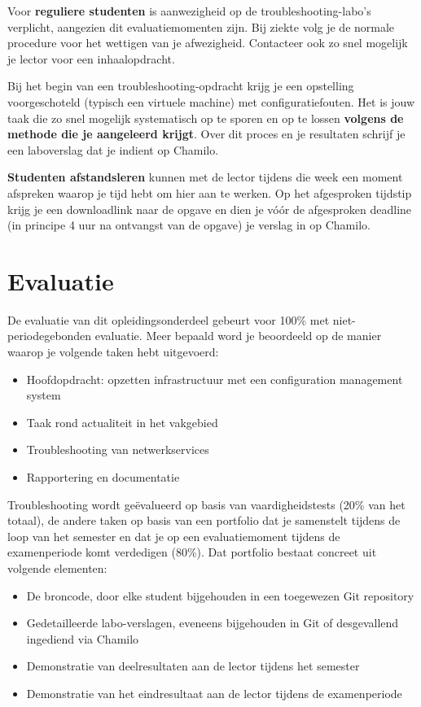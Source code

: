 Voor \textbf{reguliere studenten} is aanwezigheid op de troubleshooting-labo's verplicht, aangezien dit evaluatiemomenten zijn. Bij ziekte volg je de normale procedure voor het wettigen van je afwezigheid. Contacteer ook zo snel mogelijk je lector voor een inhaalopdracht.

Bij het begin van een troubleshooting-opdracht krijg je een opstelling voorgeschoteld (typisch een virtuele machine) met configuratiefouten. Het is jouw taak die zo snel mogelijk systematisch op te sporen en op te lossen \textbf{volgens de methode die je aangeleerd krijgt}. Over dit proces en je resultaten schrijf je een laboverslag dat je indient op Chamilo.

\textbf{Studenten afstandsleren} kunnen met de lector tijdens die week een moment afspreken waarop je tijd hebt om hier aan te werken. Op het afgesproken tijdstip krijg je een downloadlink naar de opgave en dien je vóór de afgesproken deadline (in principe 4 uur na ontvangst van de opgave) je verslag in op Chamilo.

\section{Evaluatie}
\label{sec:evaluatie}

De evaluatie van dit opleidingsonderdeel gebeurt voor 100\% met niet-periodegebonden evaluatie. Meer bepaald word je beoordeeld op de manier waarop je volgende taken hebt uitgevoerd:

\begin{itemize}
  \item Hoofdopdracht: opzetten infrastructuur met een configuration management system
  \item Taak rond actualiteit in het vakgebied
  \item Troubleshooting van netwerkservices
  \item Rapportering en documentatie
\end{itemize}

Troubleshooting wordt geëvalueerd op basis van vaardigheidstests (20\% van het totaal), de andere taken op basis van een portfolio dat je samenstelt tijdens de loop van het semester en dat je op een evaluatiemoment tijdens de examenperiode komt verdedigen (80\%). Dat portfolio bestaat concreet uit volgende elementen:

\begin{itemize}
  \item De broncode, door elke student bijgehouden in een toegewezen Git repository
  \item Gedetailleerde labo-verslagen, eveneens bijgehouden in Git of desgevallend ingediend via Chamilo
  \item Demonstratie van deelresultaten aan de lector tijdens het semester
  \item Demonstratie van het eindresultaat aan de lector tijdens de examenperiode
\end{itemize}

